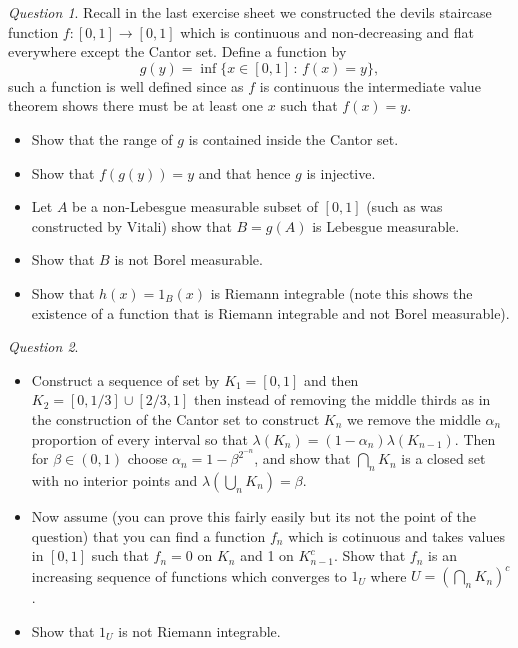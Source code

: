 \documentclass[11pt]{article}
\theoremstyle{definition}
\theoremstyle{remark}
\newtheorem{q}{Question}
\begin{document}
\begin{q}
Recall in the last exercise sheet we constructed the devils staircase function $f: [0,1] \rightarrow [0,1]$ which is continuous and non-decreasing and flat everywhere except the Cantor set. Define a function by
\[ g(y) = \inf\{ x \in [0,1] \,:\, f(x) = y\}, \] such a function is well defined since as $f$ is continuous the intermediate value theorem shows there must be at least one $x$ such that $f(x) = y$. 
\begin{itemize}
\item Show that the range of $g$ is contained inside the Cantor set.
\item Show that $f(g(y)) = y$ and that hence $g$ is injective. 
\item Let $A$ be a non-Lebesgue measurable subset of $[0,1]$ (such as was constructed by Vitali) show that $B = g(A)$ is Lebesgue measurable.
\item Show that $B$ is not Borel measurable. 
\item Show that $h(x) = 1_B(x)$ is Riemann integrable (note this shows the existence of a function that is Riemann integrable and not Borel measurable). 
\end{itemize}
\end{q}

\begin{q}
\begin{itemize}
\item Construct a sequence of set by $K_1 = [0,1]$ and then $K_2 = [0,1/3]\cup[2/3,1]$ then instead of removing the middle thirds as in the construction of the Cantor set to construct $K_n$ we remove the middle $\alpha_n$ proportion of every interval so that $\lambda(K_n) = (1-\alpha_n) \lambda(K_{n-1})$. Then for $\beta \in (0,1)$ choose $\alpha_n = 1- \beta^{2^{-n}}$, and show that $\bigcap_n K_n$ is a closed set with no interior points and $\lambda(\bigcup_n K_n) = \beta$.
\item Now assume (you can prove this fairly easily but its not the point of the question) that you can find a function $f_n$ which is cotinuous and takes values in $[0,1]$ such that $f_n =0$ on $K_n$ and 1 on $K_{n-1}^c$. Show that $f_n$ is an increasing sequence of functions which converges to $1_U$ where $U = (\bigcap_n K_n)^c$. 
\item Show that $1_U$ is not Riemann integrable.
\end{itemize}
\end{q}
\end{document}
